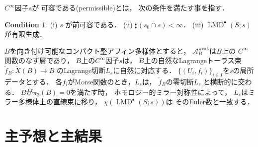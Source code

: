 \documentclass[uplatex,dvipdfmx,12pt]{jsarticle}
\numberwithin{equation}{section}
\theoremstyle{definition}
\newtheorem{condition}[theorem]{Condition}
\newcommand{\opn}[1]{\operatorname{#1}}
\begin{document}
$C^{\infty}$因子$s$が
可容である(permissible)とは，
次の条件を満たす事を指す．

\setcounter{section}{2}
\setcounter{condition}{38}
\begin{condition} \label{condition-good}
(i) $s$ が前可容である．
(ii) $\sharp (s_0\cap s)<\infty$．
(iii) $\opn{LMD}^{\bullet}(S;s)$ が有限生成．
\end{condition}

$B$を向き付け可能なコンパクト整アフィン多様体とすると，
$\mathcal{A}_B^{\mathrm{weak}}$は$B$上の
$C^{\infty}$関数のなす層であり，
$B$上の$C^{\infty}$因子$s$は，
$B$上の自然なLagrangeトーラス束
$\check{f}_B\colon \check{X}(B)\to B$
のLagrange切断$L_s$に自然に対応する．
$\{(U_i,f_i)\}_{i\in I}$を$s$の局所データとする．
各$f_i$がMorse関数のとき，$L_s$は，
$\check{f}_B$の零切断$L_{s_0}$と横断的に交わる．
$B$が$\pi_2(B) = 0$を満たす時，
ホモロジー的ミラー対称性\cite{MR1882331,MR4301560}によって，
$L_{s}$はミラー多様体上の直線束に移り，
$\chi(\opn{LMD}^{\bullet}(S;s))$は
そのEuler数と一致する．

\section{主予想と主結果}
\end{document}

